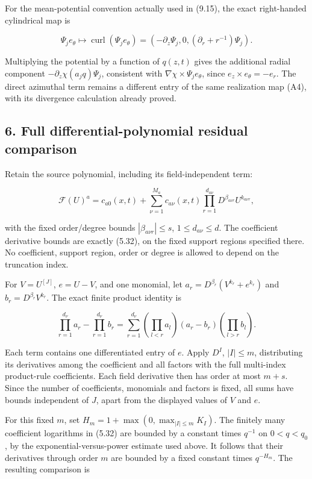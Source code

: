 \documentclass[10pt,a4paper]{article}
\begin{document}
For the mean-potential convention actually used in (9.15), the exact right-handed cylindrical map is

\[
\Psi_je_\theta\longmapsto
\operatorname{curl}(\Psi_je_\theta)
=(-\partial_z\Psi_j,0,(\partial_r+r^{-1})\Psi_j).
\tag{A25}
\]

Multiplying the potential by a function of \(q(z,t)\) gives the additional radial component \(-\partial_z\chi(a_jq)\Psi_j\), consistent with \(\nabla\chi\times\Psi_je_\theta\), since \(e_z\times e_\theta=-e_r\). The direct azimuthal term remains a different entry of the same realization map (A4), with its divergence calculation already proved.

\subsection{6. Full differential-polynomial residual comparison}\label{full-differential-polynomial-residual-comparison}

Retain the source polynomial, including its field-independent term:

\[
\mathcal F(U)^a=c_{a0}(x,t)
+\sum_{\nu=1}^{M_a}c_{a\nu}(x,t)
   \prod_{r=1}^{d_{a\nu}}D^{\beta_{a\nu r}}U^{k_{a\nu r}},
\]

with the fixed order/degree bounds \(|\beta_{a\nu r}|\le s\), \(1\le d_{a\nu}\le d\). The coefficient derivative bounds are exactly (5.32), on the fixed support regions specified there. No coefficient, support region, order or degree is allowed to depend on the truncation index.

For \(V=U^{[J]}\), \(e=U-V\), and one monomial, let \(a_r=D^{\beta_r}(V^{k_r}+e^{k_r})\) and \(b_r=D^{\beta_r}V^{k_r}\). The exact finite product identity is

\[
\prod_{r=1}^{d_\nu}a_r-\prod_{r=1}^{d_\nu}b_r
=\sum_{r=1}^{d_\nu}
  \left(\prod_{l<r}a_l\right)(a_r-b_r)
  \left(\prod_{l>r}b_l\right).
\tag{A26}
\]

Each term contains one differentiated entry of \(e\). Apply \(D^I\), \(|I|\le m\), distributing its derivatives among the coefficient and all factors with the full multi-index product-rule coefficients. Each field derivative then has order at most \(m+s\). Since the number of coefficients, monomials and factors is fixed, all sums have bounds independent of \(J\), apart from the displayed values of \(V\) and \(e\).

For this fixed \(m\), set \(H_m=1+\max(0,\max_{|I|\le m}K_I)\). The finitely many coefficient logarithms in (5.32) are bounded by a constant times \(q^{-1}\) on \(0<q<q_0\), by the exponential-versus-power estimate used above. It follows that their derivatives through order \(m\) are bounded by a fixed constant times \(q^{-H_m}\). The resulting comparison is
\end{document}
